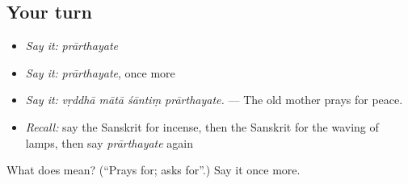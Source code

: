 \subsection*{Your turn}
\begin{itemize}
\raggedright
  \item \emph{Say it:} \emph{prārthayate}
  \item \emph{Say it:} \emph{prārthayate}, once more
  \item \emph{Say it:} \emph{vṛddhā mātā śāntiṃ prārthayate.} — The old mother prays for peace.
  \item \emph{Recall:} say the Sanskrit for incense, then the Sanskrit for the waving of lamps, then say \emph{prārthayate} again
\end{itemize}

\begin{tcolorbox}[breakable,colback=teal!4,colframe=teal!35!black,title={Before you move on}]
What does  mean? (\textquotedblleft{}Prays for; asks for\textquotedblright{}.) Say it once more.
\end{tcolorbox}
